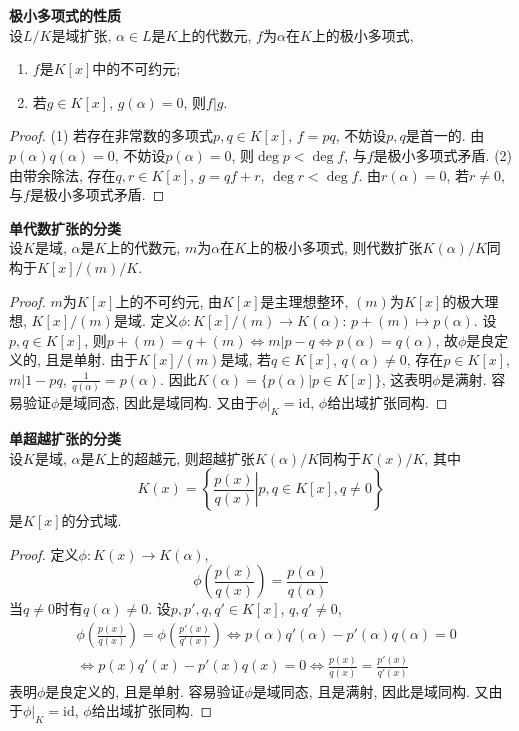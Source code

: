 \begin{pro} \textbf{极小多项式的性质}\\
设$L/K$是域扩张, $\alpha\in L$是$K$上的代数元, $f$为$\alpha$在$K$上的极小多项式,
\begin{enumerate}
\item $f$是$K[x]$中的不可约元;
\item 若$g\in K[x]$, $g(\alpha)=0$, 则$f\vert g$. 
\end{enumerate}
\end{pro}
\begin{proof}
(1) 若存在非常数的多项式$p,q\in K[x]$, $f=pq$, 不妨设$p,q$是首一的. 由$p(\alpha)q(\alpha)=0$, 不妨设$p(\alpha)=0$, 则$\deg p < \deg f$, 与$f$是极小多项式矛盾. (2) 由带余除法, 存在$q,r\in K[x]$, $g=qf+r$, $\deg r < \deg f$. 由$r(\alpha)=0$, 若$r\neq 0$, 与$f$是极小多项式矛盾.
\end{proof}

\begin{pro}\textbf{单代数扩张的分类}\\
设$K$是域, $\alpha$是$K$上的代数元, $m$为$\alpha$在$K$上的极小多项式, 则代数扩张$K(\alpha)/K$同构于$K[x]/(m) /K$. 
\end{pro}
\begin{proof}
$m$为$K[x]$上的不可约元, 由$K[x]$是主理想整环, $(m)$为$K[x]$的极大理想, $K[x]/(m)$是域. 定义$\phi: K[x]/(m) \to K(\alpha)$: $p+(m)\mapsto p(\alpha)$. 设$p,q\in K[x]$, 则$p+(m)=q+(m) \iff m | p-q \iff p(\alpha)=q(\alpha)$, 故$\phi$是良定义的, 且是单射. 由于$K[x]/(m)$是域, 若$q\in K[x]$, $q(\alpha)\neq 0$, 存在$p\in K[x]$, $m|1-pq$, $\frac{1}{q(\alpha)} = p(\alpha)$. 因此$K(\alpha)=\{p(\alpha) \vert p\in K[x]\}$, 这表明$\phi$是满射. 容易验证$\phi$是域同态, 因此是域同构. 又由于$\phi|_K=\mathrm{id}$, $\phi$给出域扩张同构.
\end{proof}

\begin{pro}\textbf{单超越扩张的分类}\\
设$K$是域, $\alpha$是$K$上的超越元, 则超越扩张$K(\alpha)/K$同构于$K(x)/K$, 其中
\begin{equation}
    K(x)=\left\{ \left.\frac{p(x)}{q(x)} \right \vert p,q \in K[x], q\neq 0 \right\}
\end{equation}
是$K[x]$的分式域. 
\end{pro}
\begin{proof}
定义$\phi: K(x)\to K(\alpha)$, 
\begin{equation}
\phi\left(\frac{p(x)}{q(x)}\right)=\frac{p(\alpha)}{q(\alpha)}
\end{equation} 
当$q\neq 0$时有$q(\alpha)\neq 0$. 设$p,p',q,q'\in K[x]$, $q,q'\neq 0$, 
\begin{align*}
&\phi\left(\frac{p(x)}{q(x)}\right)=\phi\left(\frac{p'(x)}{q'(x)}\right)
\iff p(\alpha)q'(\alpha)-p'(\alpha)q(\alpha)=0\\
& \iff p(x)q'(x)-p'(x)q(x)=0
\iff \frac{p(x)}{q(x)}=\frac{p'(x)}{q'(x)}
\end{align*}
表明$\phi$是良定义的, 且是单射. 容易验证$\phi$是域同态, 且是满射, 因此是域同构. 又由于$\phi|_K=\mathrm{id}$, $\phi$给出域扩张同构.
\end{proof}

